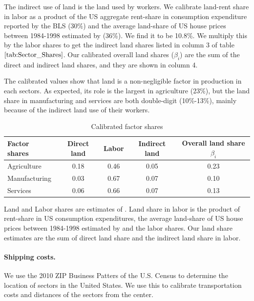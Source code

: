 \documentclass[12pt]{article}
\begin{document}
The indirect use of land is the land used by workers. We calibrate land-rent share in labor as a product of the US aggregate rent-share in consumption expenditure reported by the BLS ($30\%$) and the average land-share of US house prices between 1984-1998 estimated by  (36\%). We find it to be 10.8\%. We multiply this by the labor shares to get the indirect land shares listed in column 3 of table $\ref{tab:Sector_Shares}$. Our calibrated overall land shares ($\beta_i$) are the sum of the direct and indirect land shares, and they are shown in column 4.

The calibrated values show that land is a non-negligible factor in production in each sectors. As expected, its role is the largest in agriculture (23\%), but the land share in manufacturing and services are both double-digit (10\%-13\%), mainly because of the indirect land use of their workers.


\begin{table}[h!]
\label{tab:Sector_Shares}
\caption{Calibrated factor shares}
\begin{center}
\begin{tabular}{l|ccc|c}
\toprule
Factor shares & Direct land & Labor & Indirect land & Overall land share $\beta_i$ \\
\midrule
Agriculture & 0.18 & 0.46  & 0.05 & 0.23 \\
Manufacturing& 0.03 & 0.67 & 0.07 & 0.10  \\
Services    &  0.06 & 0.66 & 0.07 & 0.13 \\
\bottomrule
\end{tabular}
\end{center}

\noindent \footnotesize{Land and Labor shares are estimates of . Land share in labor is the product of rent-share in US consumption expenditures, the average land-share of US house prices between 1984-1998 estimated by  and the labor shares. Our land share estimates are the sum of direct land share and the indirect land share in labor.}
\end{table}

\paragraph{Shipping costs.}
We use the 2010 ZIP Business Patters of the U.S. Census to determine the location of sectors in the United States. We use this to calibrate transportation costs and distances of the sectors from the center.
\end{document}

